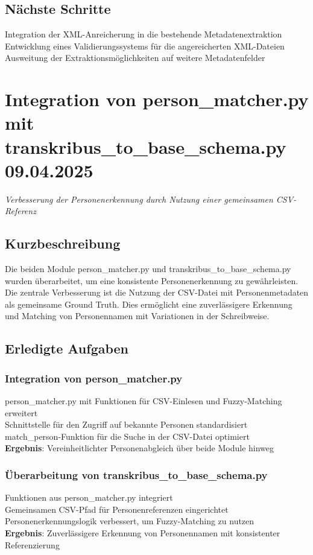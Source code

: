 \documentclass{article}
\begin{document}
\subsection*{Nächste Schritte}
 Integration der XML-Anreicherung in die bestehende Metadatenextraktion\\
 Entwicklung eines Validierungssystems für die angereicherten XML-Dateien\\
 Ausweitung der Extraktionsmöglichkeiten auf weitere Metadatenfelder

\noindent\hrulefill

\section{Integration von person\_matcher.py mit transkribus\_to\_base\_schema.py \small 09.04.2025}
\small\textit{Verbesserung der Personenerkennung durch Nutzung einer gemeinsamen CSV-Referenz}\\
\subsection*{Kurzbeschreibung}

Die beiden Module person\_matcher.py und transkribus\_to\_base\_schema.py wurden überarbeitet, um eine konsistente Personenerkennung zu gewährleisten. Die zentrale Verbesserung ist die Nutzung der CSV-Datei mit Personenmetadaten als gemeinsame Ground Truth. Dies ermöglicht eine zuverlässigere Erkennung und Matching von Personennamen mit Variationen in der Schreibweise.

\subsection*{Erledigte Aufgaben}
\subsubsection*{\small Integration von person\_matcher.py}
 person\_matcher.py mit Funktionen für CSV-Einlesen und Fuzzy-Matching erweitert\\
 Schnittstelle für den Zugriff auf bekannte Personen standardisiert\\
 match\_person-Funktion für die Suche in der CSV-Datei optimiert\\
\textbf{Ergebnis}: Vereinheitlichter Personenabgleich über beide Module hinweg

\subsubsection*{\small Überarbeitung von transkribus\_to\_base\_schema.py}
 Funktionen aus person\_matcher.py integriert\\
 Gemeinsamen CSV-Pfad für Personenreferenzen eingerichtet\\
 Personenerkennungslogik verbessert, um Fuzzy-Matching zu nutzen\\
\textbf{Ergebnis}: Zuverlässigere Erkennung von Personennamen mit konsistenter Referenzierung
\end{document}
